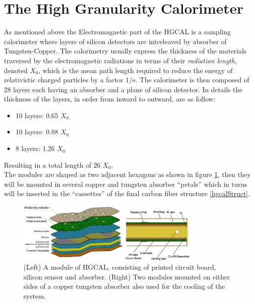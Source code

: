 \section{The High Granularity Calorimeter}
As mentioned above the Electromagnetic part of the HGCAL is a sampling calorimeter where layers of silicon detectors are interleaved by absorber of Tungsten-Copper.
The calorimetry usually express the thickness of the materials traversed by the electromagnetic radiations in terms of their \textit{radiation length}, denoted $X_0$, which is the mean path length required to reduce the energy of relativistic charged particles by a factor $1/\mathrm {e}$. The calorimeter is then composed of 28 layers each having an absorber and a plane of silicon detector. In details the thickness of the layers, in order from inward to outward, are as follow:
\begin{itemize}
\item 10 layers: 0.65 $X_0$
\item 10 layers: 0.88 $X_0$
\item 8 layers: 1.26 $X_0$
\end{itemize}
Resulting in a total length of 26 $X_0$.\\
The modules are shaped as two adjacent hexagons as shown in figure \ref{hgcalMod}, then they will be mounted in several copper and tungsten absorber ``petals'' which in turns will be inserted in the ``cassettes'' of the final carbon fiber structure \ref{hgcalStruct}.

\begin{figure}
\centerline{\includegraphics[width=0.8\textwidth]{intro/hgcalMod.png}}
\caption{(Left) A module of HGCAL, consisting of printed circuit board, silicon sensor and absorber. (Right) Two modules mounted on either sides of a copper tungsten absorber also used for the cooling of the system.}
\label{hgcalMod}
\end{figure}

